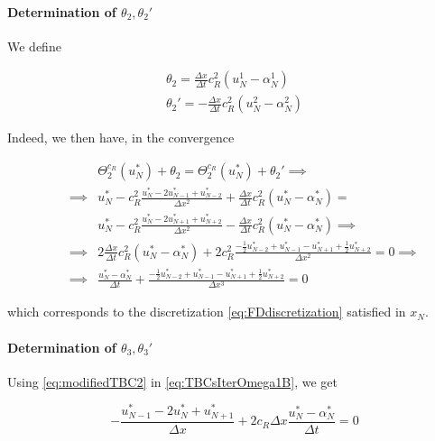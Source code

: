 \paragraph{Determination of $\theta_2, \theta_2'$}

\indent We define

\begin{equation*}
\begin{gathered}
    \theta_2 = \frac{\Delta x}{\Delta t} c_R^2 (u_N^1 - \alpha_N^1) \\
    \theta_2' = -\frac{\Delta x}{\Delta t} c_R^2 (u_N^2 - \alpha_N^2)
\end{gathered}
\end{equation*}

\indent Indeed, we then have, in the convergence

\begin{equation}
\label{eq:modifiedTBC2}
\begin{aligned}
&& &\Theta_2^{c_R}(u_N^*) + \theta_2 = \Theta_2^{c_R}(u_N^*) + \theta_2'\implies \\
&& \implies & u_N^* - c_R^2 \frac{u_N^* - 2u_{N-1}^* + u_{N-2}^*}{\Delta x^2} + \frac{\Delta x}{\Delta t} c_R^2 (u_N^* - \alpha_N^*)  = \\ && & u_N^* - c_R^2 \frac{u_N^* - 2u_{N+1}^* + u_{N+2}^*}{\Delta x^2} -\frac{\Delta x}{\Delta t} c_R^2 (u_N^* - \alpha_N^*) \implies \\
&& \implies & 2\frac{\Delta x}{\Delta t} c_R^2 (u_N^* - \alpha_N^*) + 2c_R^2 \frac{-\frac{1}{2}u_{N-2}^* + u_{N-1}^* - u_{N+1}^* + \frac{1}{2}u_{N+2}^* }{\Delta x^2} = 0  \implies \\
&& \implies &\frac{u_N^* - \alpha_N^*}{\Delta t} + \frac{-\frac{1}{2}u_{N-2}^* + u_{N-1}^* - u_{N+1}^* + \frac{1}{2}u_{N+2}^* }{\Delta x^3} = 0
\end{aligned}
\end{equation}

\noindent which corresponds to the discretization \eqref{eq:FDdiscretization} satisfied in $x_N$.


\paragraph{Determination of $\theta_3, \theta_3'$}

\indent Using \eqref{eq:modifiedTBC2} in \eqref{eq:TBCsIterOmega1B}, we get

\begin{equation*}
-\frac{u_{N-1}^* - 2 u_{N}^* + u_{N+1}^*}{\Delta x} + 2c_R\Delta x\frac{u_N^* - \alpha_N^*}{\Delta t} = 0 
\end{equation*}

